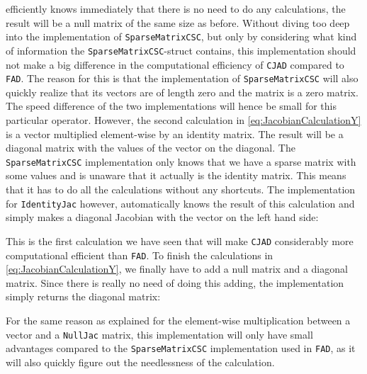 efficiently knows immediately that there is no need to do any calculations, the result will be a null matrix of the same size as before. Without diving too deep into the implementation of \texttt{SparseMatrixCSC}, but only by considering what kind of information the \texttt{SparseMatrixCSC}-struct contains, this implementation should not make a big difference in the computational efficiency of \texttt{CJAD} compared to \texttt{FAD}. The reason for this is that the implementation of \texttt{SparseMatrixCSC} will also quickly realize that its vectors are of length zero and the matrix is a zero matrix. The speed difference of the two implementations will hence be small for this particular operator. However, the second calculation in \eqref{eq:JacobianCalculationY} is a vector multiplied element-wise by an identity matrix. The result will be a diagonal matrix with the values of the vector on the diagonal. The \texttt{SparseMatrixCSC} implementation only knows that we have a sparse matrix with some values and is unaware that it actually is the identity matrix. This means that it has to do all the calculations without any shortcuts.  The implementation for \texttt{IdentityJac} however, automatically knows the result of this calculation and simply makes a diagonal Jacobian with the vector on the left hand side:

This is the first calculation we have seen that will make \texttt{CJAD} considerably more computational efficient than \texttt{FAD}. To finish the calculations in \eqref{eq:JacobianCalculationY}, we finally have to add a null matrix and a diagonal matrix. Since there is really no need of doing this adding, the implementation simply returns the diagonal matrix:

For the same reason as explained for the element-wise multiplication between a vector and a \texttt{NullJac} matrix, this implementation will only have small advantages compared to the \texttt{SparseMatrixCSC} implementation used in \texttt{FAD}, as it will also quickly figure out the needlessness of the calculation.

